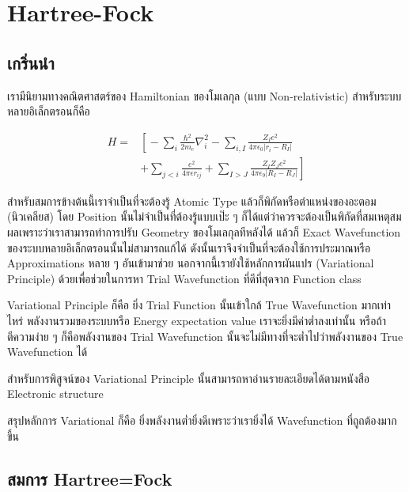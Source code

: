 
\chapter{Hartree-Fock}

\section{เกริ่นนำ}

เรามีนิยามทางคณิตศาสตร์ของ Hamiltonian ของโมเลกุล (แบบ Non-relativistic) สำหรับระบบหลายอิเล็กตรอนก็คือ

\begin{equation}
    \begin{aligned}
        H = &
        \left[ \right.
        -\sum_{i} \frac{\hbar^{2}}{2m_{e}} \nabla^{2}_{i}
        -\sum_{i,I} \frac{Z_{I} e^{2}}{4\pi\epsilon_{0} |r_{i} - R_{I}|} \\
            & +\sum_{j<i} \frac{e^{2}}{4\pi\epsilon r_{ij}}
        +\sum_{I>J} \frac{Z_{I} Z_{J} e^{2}}{4\pi\epsilon_{9} |R_{I} - R_{J}|}
        \left. \right]
    \end{aligned}
\end{equation}

สำหรับสมการข้างต้นนี้เราจำเป็นที่จะต้องรู้ Atomic Type แล้วก็พิกัดหรือตำแหน่งของอะตอม (นิวเคลียส)
โดย Position นั้นไม่จำเป็นที่ต้องรู้แบบเป๊ะ ๆ ก็ได้แต่ว่าควรจะต้องเป็นพิกัดที่สมเหตุสมผลเพราะว่าเราสามารถทำการปรับ
Geometry ของโมเลกุลทีหลังได้ แล้วก็ Exact Wavefunction ของระบบหลายอิเล็กตรอนนั้นไม่สามารถแก้ได้
ดังนั้นเราจึงจำเป็นที่จะต้องใช้การประมาณหรือ Approximations หลาย ๆ อันเข้ามาช่วย นอกจากนี้เรายังใช้หลักการผันแปร
(Variational Principle) ด้วยเพื่อช่วยในการหา Trial Wavefunction ที่ดีที่สุดจาก Function class

Variational Principle ก็คือ ยิ่ง Trial Function นั้นเข้าใกล้ True Wavefunction มากเท่าไหร่
พลังงานรวมของระบบหรือ Energy expectation value เราจะยิ่งมีค่าต่ำลงเท่านั้น หรือถ้าตีความง่าย ๆ
ก็คือพลังงานของ Trial Wavefunction นั้นจะไม่มีทางที่จะต่ำไปว่าพลังงานของ True Wavefunction ได้

สำหรับการพิสูจน์ของ Variational Principle นั้นสามารถหาอ่านรายละเอียดได้ตามหนังสือ Electronic
structure

สรุปหลักการ Variational ก็คือ ยิ่งพลังงานต่ำยิ่งดีเพราะว่าเรายิ่งได้ Wavefunction ที่ถูถต้องมากขึ้น

\section{สมการ Hartree=Fock}

